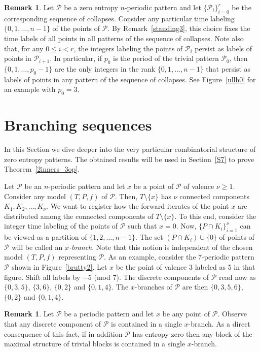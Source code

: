 \documentclass[a4paper]{amsart}
\theoremstyle{definition}
\newtheorem{remark}[theorem]{Remark}
\begin{document}
\begin{remark}\label{persist}
Let $\mathcal{P}$ be a zero entropy $n$-periodic pattern and let $\{\mathcal{P}_i\}_{i=0}^r$ be the corresponding sequence of collapses.
Consider any particular time labeling $\{0,1,\ldots,n-1\}$ of the points of $\mathcal{P}$. By
Remark~\ref{standing3}, this choice fixes the time labels of all points in all patterns of the sequence of collapses. Note also that, for any
$0\le i<r$, the integers labeling the points of $\mathcal{P}_i$ persist as labels of points in $\mathcal{P}_{i+1}$. In particular,
if $p_0$ is the period of the trivial pattern $\mathcal{P}_0$, then $\{0,1,\ldots,p_0-1\}$ are the only integers in the rank $\{0,1,\ldots,n-1\}$
that persist as labels of points in any pattern of the sequence of collapses. See Figure~\ref{ullh0} for an example with $p_0=3$.
\end{remark}


\section{Branching sequences}\label{S6b}
In this Section we dive deeper into the very particular combinatorial structure of zero entropy patterns. The obtained results
will be used in Section~\ref{S7} to prove Theorem~\ref{2inners_3op}.

Let $\mathcal{P}$ be an $n$-periodic pattern and let $x$ be a point of $\mathcal{P}$ of valence $\nu\ge1$. Consider any model $(T,P,f)$ of $\mathcal{P}$. Then, $T\setminus\{x\}$ has $\nu$ connected components $K_1,K_2,\ldots,K_\nu$. We want to register how the forward iterates of the point $x$ are distributed among the connected components of $T\setminus\{x\}$. To this end, consider the integer time labeling of the points of $\mathcal{P}$ such that $x=0$. Now, $\{P\cap K_i\}_{i=1}^\nu$ can be viewed as a partition of $\{1,2,\ldots,n-1\}$. The set $(P\cap K_i)\cup\{0\}$ of points of $\mathcal{P}$ will be called an \emph{$x$-branch}. Note that this notion is independent of the chosen model $(T,P,f)$ representing $\mathcal{P}$. As an example, consider the 7-periodic pattern $\mathcal{P}$ shown in Figure~\ref{brutty2}. Let $x$ be the point of valence 3 labeled as 5 in that
figure. Shift all labels by $-5$ (mod 7). The discrete components of $\mathcal{P}$ read now as $\{0,3,5\}$, $\{3,6\}$, $\{0,2\}$ and $\{0,1,4\}$. The $x$-branches of $\mathcal{P}$ are then $\{0,3,5,6\}$, $\{0,2\}$ and $\{0,1,4\}$.

\begin{remark}\label{isi}
Let $\mathcal{P}$ be a periodic pattern and let $x$ be any point of $\mathcal{P}$. Observe that any discrete component of $\mathcal{P}$ is contained in a single $x$-branch. As a direct consequence of this fact, if in addition $\mathcal{P}$ has entropy zero then any block of the maximal structure of trivial blocks is contained in a single $x$-branch.
\end{remark}
\end{document}

